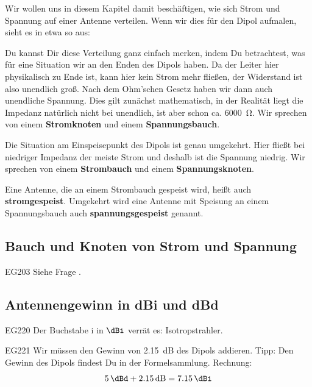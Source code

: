 \begin{ohmchapter}
    Wir wollen uns in diesem Kapitel damit beschäftigen, wie sich Strom und Spannung auf einer Antenne verteilen. Wenn wir dies für den Dipol aufmalen, sieht es in etwa so aus:

    Du kannst Dir diese Verteilung ganz einfach merken, indem Du betrachtest, was für eine Situation wir an den Enden des Dipols haben. Da der Leiter hier physikalisch zu Ende ist, kann hier kein Strom mehr fließen, der Widerstand ist also unendlich groß. Nach dem Ohm’schen Gesetz haben wir dann auch unendliche Spannung. Dies gilt zunächst mathematisch, in der Realität liegt die Impedanz natürlich nicht bei unendlich, ist aber schon ca. \SI{6000}{\ohm}. Wir sprechen von einem \textbf{Stromknoten} und einem \textbf{Spannungsbauch}.

    Die Situation am Einspeisepunkt des Dipols ist genau umgekehrt. Hier fließt bei niedriger Impedanz der meiste Strom und deshalb ist die Spannung niedrig. Wir sprechen von einem \textbf{Strombauch} und einem \textbf{Spannungsknoten}.

    Eine Antenne, die an einem Strombauch gespeist wird, heißt auch \textbf{stromgespeist}. Umgekehrt wird eine Antenne mit Speisung an einem Spannungsbauch auch \textbf{spannungsgespeist} genannt.

\end{ohmchapter}


\subsection{Bauch und Knoten von Strom und Spannung}

\begin{sol}{EG203}
    Siehe Frage .
\end{sol}


\begin{ohmchapter}
\end{ohmchapter}


\subsection{Antennengewinn in dBi und dBd}


\begin{sol}{EG220}
    Der Buchstabe i in $\unit{\dBi}$ verrät es: Isotropstrahler.
\end{sol}


\begin{sol}{EG221}
    Wir müssen den Gewinn von \qty{2,15}{\dB}  des Dipols addieren. 
    Tipp: Den Gewinn des Dipols findest Du in der Formelsammlung.
    Rechnung: $$ \qty{5}{\dBd} + \qty{2,15}{\dB} = \qty{7,15}{\dBi}$$ 
\end{sol}

